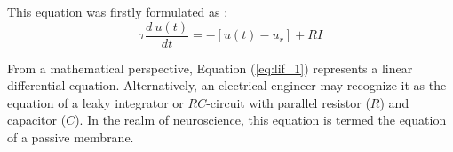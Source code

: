 \documentclass[11pt]{article}
\begin{document}

This equation was firstly formulated as :
\begin{equation}
  \tau \frac{d \: u(t)}{dt} = - [u(t) - u_{r}] + RI
  \label{eq:lif_1}
\end{equation}

From a mathematical perspective, Equation (\ref{eq:lif_1}) represents a linear differential equation. Alternatively, an electrical engineer may recognize it as the equation of a leaky integrator or $RC$-circuit with parallel resistor ($R$) and capacitor ($C$). In the realm of neuroscience, this equation is termed the equation of a passive membrane. \cite{neuronal_dynamics}
\end{document}
